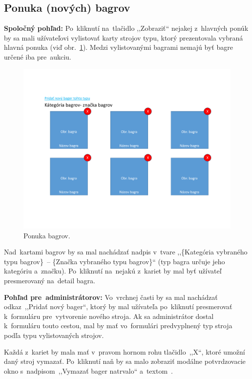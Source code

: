 \subsection{Ponuka (nových) bagrov}
\label{ponuka novych bagrov}

\textbf{Spoločný pohľad:} Po~kliknutí na~tlačidlo ,,Zobraziť`` nejakej z~hlavných ponúk by sa mali užívateľovi vylistovať karty strojov typu, ktorý prezentovala vybraná hlavná ponuka (viď obr.~\ref{excavator cards}). Medzi vylistovanými bagrami nemajú byť bagre určené iba pre~aukciu.

\begin{figure}[H]\centering
\includegraphics[width=140mm]{../img/UI concept/excavator cards}
\caption{Ponuka bagrov.}
\label{excavator cards}
\end{figure}

Nad~kartami bagrov by sa mal nachádzať nadpis v~tvare ,,\{Kategória vybraného typu bagrov\}~-- \{Značka vybraného typu bagrov\}`` (typ bagra určuje jeho kategóriu a~značku). Po~kliknutí na~nejakú z~kariet by mal byť užívateľ presmerovaný na~detail bagra.

\textbf{Pohľad pre~administrátorov:} Vo~vrchnej časti by sa mal nachádzať odkaz~,,Pridať nový bager``, ktorý by mal užívateľa po~kliknutí presmerovať k~formuláru pre~vytvorenie nového stroja. Ak sa administrátor dostal k~formuláru touto cestou, mal by mať vo~formulári predvyplnený typ stroja podľa typu vylistovaných strojov.

Každá z~kariet by mala mať v~pravom hornom rohu tlačidlo~,,X``, ktoré umožní daný stroj vymazať. Po~kliknutí naň by sa malo zobraziť modálne potvrdzovacie okno s~nadpisom~,,Vymazať bager natrvalo`` a~textom~.

